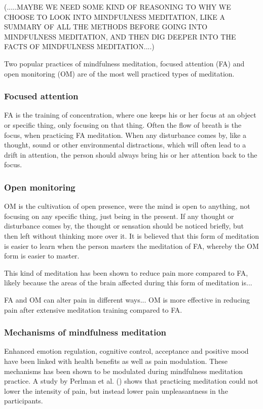 (.....MAYBE WE NEED SOME KIND OF REASONING TO WHY WE CHOOSE TO LOOK INTO MINDFULNESS MEDITATION, LIKE A SUMMARY OF ALL THE METHODS BEFORE GOING INTO MINDFULNESS MEDITATION, AND THEN DIG DEEPER INTO THE FACTS OF MINDFULNESS MEDITATION....)



Two popular practices of mindfulness meditation, focused attention (FA) and open monitoring (OM) are of the most well practiced types of meditation. \cite{Zeidan2016}

\subsubsection{Focused attention} 
FA is the training of concentration, where one keeps his or her focus at an object or specific thing, only focusing on that thing. Often the flow of breath is the focus, when practicing FA meditation.  When any disturbance comes by, like a thought, sound or other environmental distractions, which will often lead to a drift in attention, the person should always bring his or her attention back to the focus. \cite{Zeidan2016}


\subsubsection{Open monitoring}
OM is the cultivation of open presence, were the mind is open to anything, not focusing on any specific thing, just being in the present. If any thought or disturbance comes by, the thought or sensation should be noticed briefly, but then left without thinking more over it. It is believed that this form of meditation is easier to learn when the person masters the meditation of FA, whereby the OM form is easier to master. \cite{Zeidan2016}

This kind of meditation has been shown to reduce pain more compared to FA, likely because the areas of the brain affected during this form of meditation is...\cite{Perlman2010}

FA and OM can alter pain in different ways...
OM is more effective in reducing pain after extensive meditation training compared to FA. 
\cite{Varilly2012}

\subsubsection{Mechanisms of mindfulness meditation}
Enhanced emotion regulation, cognitive control, acceptance and positive mood have been linked with health benefits as well as pain modulation. These mechanisms has been shown to be modulated during mindfulness meditation practice.
A study by Perlman et al. (\cite{Perlman2010}) shows that practicing meditation could not lower the intensity of pain, but instead lower pain unpleasantness in the participants. \cite{Zeidan2012, Perlman2010}

